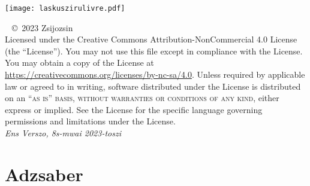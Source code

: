 \documentclass[12pt, a4paper]{legportokali}
\begin{document}

\onehalfspacing

\titlepage
{\texttt{[image: laskuszirulivre.pdf]}}

\thispagestyle{empty}
~\vfill
{
	\noindent \copyright\ 2023 Zsijozsin \\
	Licensed under the Creative Commons Attribution-NonCommercial 4.0 License (the ``License'').
	You may not use this file except in compliance with the License. You may obtain a copy of the
	License at \url{https://creativecommons.org/licenses/by-nc-sa/4.0}. Unless required by applicable
	law or agreed to in writing, software distributed under the License is distributed on an
	\textsc{``as is'' basis, without warranties or conditions of any kind}, either express or implied.
	See the License for the specific language governing permissions and limitations under the License. \\
	\textit{Ens Verszo, 8s-mwai 2023-toszi}
}

\pagestyle{empty}
\tableofcontents
\listoffigures
\listoftables

\pagestyle{fancy}
\cleardoublepage



\part{Adzsaber}

\end{document}
